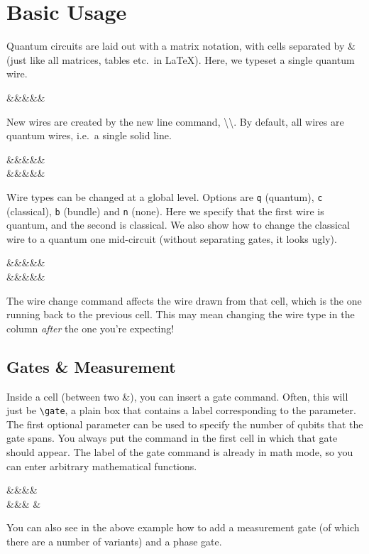 \documentclass[aps,pra,10pt,nofootinbib]{revtex4-2}
\begin{document}
\section{Basic Usage}

Quantum circuits are laid out with a matrix notation, with cells separated by \& (just like all matrices, tables etc.\ in \LaTeX). Here, we typeset a single quantum wire.
\begin{Code}
  \begin{quantikz}
    &&&&&
  \end{quantikz}
\end{Code}

New wires are created by the new line command, \textbackslash\textbackslash. By default, all wires are quantum wires, i.e.\ a single solid line.
\begin{Code}
  \begin{quantikz}
    &&&&& \\
    &&&&&
  \end{quantikz}
\end{Code}
Wire types can be changed at a global level. Options are \texttt{q} (quantum), \texttt{c} (classical), \texttt{b} (bundle) and \texttt{n} (none). Here we specify that the first wire is quantum, and the second is classical. We also show how to change the classical wire to a quantum one mid-circuit (without separating gates, it looks ugly).
\begin{Code}
  \begin{quantikz}[wire types={q,c}]
    &&&&& \\
    &&&&&
  \end{quantikz}
\end{Code}
The wire change command affects the wire drawn from that cell, which is the one running back to the previous cell. This may mean changing the wire type in the column \emph{after} the one you're expecting!

\subsection{Gates \& Measurement}

Inside a cell (between two \&), you can insert a gate command. Often, this will just be \verb|\gate|, a plain box that contains a label corresponding to the parameter. The first optional parameter can be used to specify the number of qubits that the gate spans. You always put the command in the first cell in which that gate should appear. The label of the gate command is already in math mode, so you can enter arbitrary mathematical functions.
\begin{Code}
  \begin{quantikz}
    &&&& \meter{} \\
    &&&\phase{\alpha} &
  \end{quantikz}
\end{Code}
You can also see in the above example how to add a measurement gate (of which there are a number of variants) and a phase gate.
\end{document}

